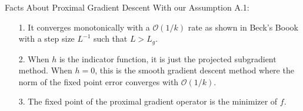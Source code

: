 \documentclass[11pt]{beamer}
\begin{document}
        \begin{frame}{Facts About Proximal Gradient Descent}
            With our Assumption A.1: 
            \begin{itemize}
                \item [1.] It converges monotonically with a $\mathcal O(1/k)$ rate as shown in Beck's Boook\cite{book:first_order_opt} with a step size $L^{-1}$ such that $L > L_g$. 
                \item [2.] When $h$ is the indicator function, it is just the projected subgradient method. When $h = 0$, this is the smooth gradient descent method where the norm of the fixed point error converges with $\mathcal O(1/k)$\cite{book:first_order_opt}. 
                \item [3.] The fixed point of the proximal gradient operator is the minimizer of $f$. 
            \end{itemize}
        \end{frame}
\end{document}
